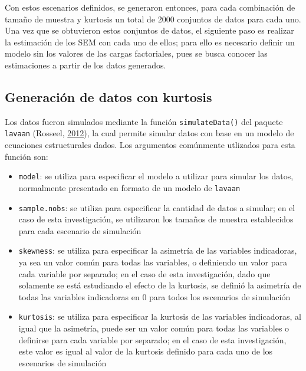 \documentclass[
  english]{revcoles}
\providecommand{\tightlist}{%
  \setlength{\itemsep}{0pt}\setlength{\parskip}{0pt}}
\begin{document}
Con estos escenarios definidos, se generaron entonces, para cada
combinación de tamaño de muestra y kurtosis un total de 2000 conjuntos
de datos para cada uno. Una vez que se obtuvieron estos conjuntos de
datos, el siguiente paso es realizar la estimación de los SEM con cada
uno de ellos; para ello es necesario definir un modelo sin los valores
de las cargas factoriales, pues se busca conocer las estimaciones a
partir de los datos generados.

\subsection{Generación de datos con kurtosis}

Los datos fueron simulados mediante la función \texttt{simulateData()}
del paquete \texttt{lavaan} (Rosseel,
\protect\hyperlink{ref-lavaan}{2012}), la cual permite simular datos con
base en un modelo de ecuaciones estructurales dados. Los argumentos
comúnmente utlizados para esta función son:

\begin{itemize}
\tightlist
\item
  \texttt{model}: se utiliza para especificar el modelo a utilizar para
  simular los datos, normalmente presentado en formato de un modelo de
  \texttt{lavaan}
\item
  \texttt{sample.nobs}: se utiliza para especificar la cantidad de datos
  a simular; en el caso de esta investigación, se utilizaron los tamaños
  de muestra establecidos para cada escenario de simulación
\item
  \texttt{skewness}: se utiliza para especificar la asimetría de las
  variables indicadoras, ya sea un valor común para todas las variables,
  o definiendo un valor para cada variable por separado; en el caso de
  esta investigación, dado que solamente se está estudiando el efecto de
  la kurtosis, se definió la asimetría de todas las variables
  indicadoras en 0 para todos los escenarios de simulación
\item
  \texttt{kurtosis}: se utiliza para especificar la kurtosis de las
  variables indicadoras, al igual que la asimetría, puede ser un valor
  común para todas las variables o definirse para cada variable por
  separado; en el caso de esta investigación, este valor es igual al
  valor de la kurtosis definido para cada uno de los escenarios de
  simulación
\end{itemize}
\end{document}
